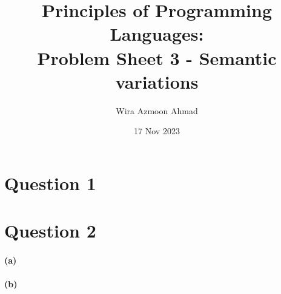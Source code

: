 \documentclass[11pt]{article} %
\title{Principles of Programming Languages: \\Problem Sheet 3 - Semantic variations}
\author{Wira Azmoon Ahmad}
\date{17 Nov 2023}
\begin{document}
%
\maketitle




\section*{Question 1}



\clearpage
\section*{Question 2}

\paragraph{(a)}



\paragraph{(b)}
\end{document}
